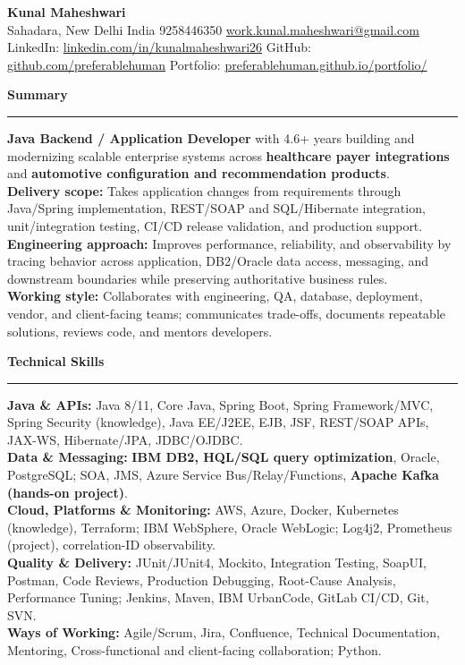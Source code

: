 \documentclass[11pt,letterpaper]{article}
\newcommand{\ressection}[1]{\Needspace{5\baselineskip}\vspace{8pt}\par\textbf{#1}\par\vspace{2pt}\hrule\vspace{5pt}}
\begin{document}
\pagestyle{empty}\raggedright\fontsize{11}{12.4}\selectfont

{\Large \textbf{Kunal Maheshwari}}\\
Sahadara, New Delhi India \textbar{} 9258446350 \textbar{} \href{mailto:work.kunal.maheshwari@gmail.com}{work.kunal.maheshwari@gmail.com}\\
LinkedIn: \href{https://www.linkedin.com/in/kunalmaheshwari26}{linkedin.com/in/kunalmaheshwari26} \textbar{} GitHub: \href{https://github.com/preferablehuman}{github.com/preferablehuman} \textbar{} Portfolio: \href{https://preferablehuman.github.io/portfolio/}{preferablehuman.github.io/portfolio/}

\ressection{Summary}
\textbf{Java Backend / Application Developer} with 4.6+ years building and modernizing scalable enterprise systems across \textbf{healthcare payer integrations} and \textbf{automotive configuration and recommendation products}.\\[2pt]
\textbf{Delivery scope:} Takes application changes from requirements through Java/Spring implementation, REST/SOAP and SQL/Hibernate integration, unit/integration testing, CI/CD release validation, and production support.\\[2pt]
\textbf{Engineering approach:} Improves performance, reliability, and observability by tracing behavior across application, DB2/Oracle data access, messaging, and downstream boundaries while preserving authoritative business rules.\\[2pt]
\textbf{Working style:} Collaborates with engineering, QA, database, deployment, vendor, and client-facing teams; communicates trade-offs, documents repeatable solutions, reviews code, and mentors developers.

\ressection{Technical Skills}
\textbf{Java \& APIs:} Java 8/11, Core Java, Spring Boot, Spring Framework/MVC, Spring Security (knowledge), Java EE/J2EE, EJB, JSF, REST/SOAP APIs, JAX-WS, Hibernate/JPA, JDBC/OJDBC.\\
\textbf{Data \& Messaging:} \textbf{IBM DB2, HQL/SQL query optimization}, Oracle, PostgreSQL; SOA, JMS, Azure Service Bus/Relay/Functions, \textbf{Apache Kafka (hands-on project)}.\\
\textbf{Cloud, Platforms \& Monitoring:} AWS, Azure, Docker, Kubernetes (knowledge), Terraform; IBM WebSphere, Oracle WebLogic; Log4j2, Prometheus (project), correlation-ID observability.\\
\textbf{Quality \& Delivery:} JUnit/JUnit4, Mockito, Integration Testing, SoapUI, Postman, Code Reviews, Production Debugging, Root-Cause Analysis, Performance Tuning; Jenkins, Maven, IBM UrbanCode, GitLab CI/CD, Git, SVN.\\
\textbf{Ways of Working:} Agile/Scrum, Jira, Confluence, Technical Documentation, Mentoring, Cross-functional and client-facing collaboration; Python.
\end{document}

